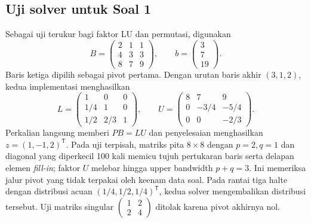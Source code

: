 \documentclass[12pt,a4paper]{article}
\numberwithin{equation}{section}
\begin{document}
\subsection{Uji solver untuk Soal 1}
Sebagai uji terukur bagi faktor LU dan permutasi, digunakan
\[
B=\begin{pmatrix}2&1&1\\4&3&3\\8&7&9\end{pmatrix},\qquad
b=\begin{pmatrix}3\\7\\19\end{pmatrix}.
\]
Baris ketiga dipilih sebagai pivot pertama. Dengan urutan baris akhir $(3,1,2)$, kedua implementasi menghasilkan
\[
L=\begin{pmatrix}1&0&0\\1/4&1&0\\1/2&2/3&1\end{pmatrix},\qquad
U=\begin{pmatrix}8&7&9\\0&-3/4&-5/4\\0&0&-2/3\end{pmatrix}.
\]
Perkalian langsung memberi $PB=LU$ dan penyelesaian menghasilkan $z=(1,-1,2)^\mathsf{T}$. Pada uji terpisah, matriks pita $8\times8$ dengan $p=2,q=1$ dan diagonal yang diperkecil 100 kali memicu tujuh pertukaran baris serta delapan elemen \emph{fill-in}; faktor $U$ melebar hingga upper bandwidth $p+q=3$. Ini memeriksa jalur pivot yang tidak terpakai oleh keenam data soal. Pada rantai tiga halte dengan distribusi acuan $(1/4,1/2,1/4)^\mathsf{T}$, kedua solver mengembalikan distribusi tersebut. Uji matriks singular $\left(\begin{smallmatrix}1&2\\2&4\end{smallmatrix}\right)$ ditolak karena pivot akhirnya nol.
\end{document}

